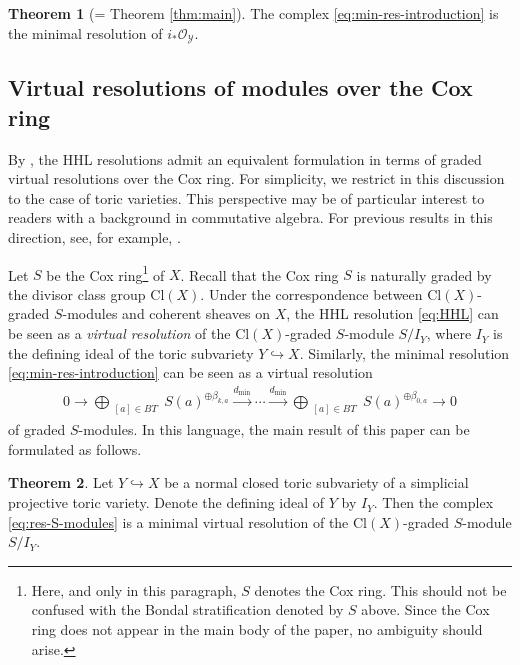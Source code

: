 \documentclass[11pt,reqno]{amsart}
\theoremstyle{definition}
\newtheorem{theorem}{Theorem}[section]
\numberwithin{equation}{section}
\begin{document}
\begin{theorem}[= Theorem \ref{thm:main}]
    The complex \eqref{eq:min-res-introduction} is the minimal resolution of $i_*\mathcal{O}_{\mathcal{Y}}$.
\end{theorem}

\smallskip

\subsection{Virtual resolutions of modules over the Cox ring}

By \cite{BH,BCHSY}, the HHL resolutions admit an equivalent formulation in terms of graded virtual resolutions over the Cox ring. For simplicity, we restrict in this discussion to the case of toric varieties. This perspective may be of particular interest to readers with a background in commutative algebra. For previous results in this direction, see, for example, \cite{BES, BE, BCHS, CH, Yang}.

\smallskip

Let $S$ be the Cox ring\footnote{Here, and only in this paragraph, $S$ denotes the Cox ring. This should not be confused with the Bondal stratification denoted by $S$ above. Since the Cox ring does not appear in the main body of the paper, no ambiguity should arise.} of $X$. Recall that the Cox ring $S$ is naturally graded by the divisor class group $\mathrm{Cl}(X)$. Under the correspondence between $\mathrm{Cl}(X)$-graded $S$-modules and coherent sheaves on $X$, the HHL resolution \eqref{eq:HHL} can be seen as a \textit{virtual resolution} of the $\mathrm{Cl}(X)$-graded $S$-module $S/I_{Y}$, where $I_Y$ is the defining ideal of the toric subvariety $Y\hookrightarrow X$. Similarly, the minimal resolution \eqref{eq:min-res-introduction} can be seen as a virtual resolution
\begin{align}\label{eq:res-S-modules}
    0\rightarrow\bigoplus_{\substack{[a]\in BT }} S(a)^{\oplus\beta_{k,a}} \xrightarrow{d_{\min}} \cdots  \xrightarrow{d_{\min}} \bigoplus_{\substack{[a]\in BT }} S(a)^{\oplus\beta_{0,a}}\rightarrow0
\end{align}
of graded $S$-modules. In this language, the main result of this paper can be formulated as follows.

\begin{theorem}
    Let $Y\hookrightarrow X$ be a normal closed toric subvariety of a simplicial projective toric variety. Denote the defining ideal of $Y$ by $I_Y$. Then the complex \eqref{eq:res-S-modules} is a minimal virtual resolution of the $\mathrm{Cl}(X)$-graded $S$-module $S/I_Y$.
\end{theorem}
\end{document}
